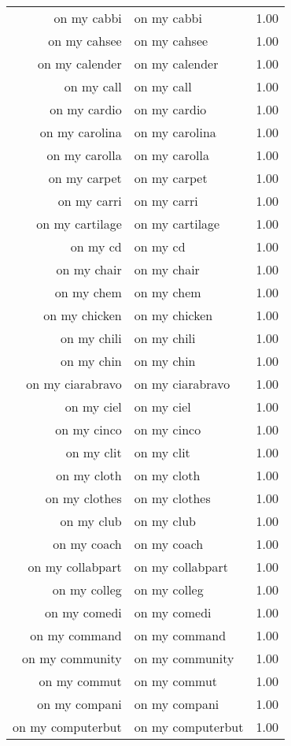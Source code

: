 \begin{table}[ht]
\begin{tabular}{rlr}
  on my cabbi & on my cabbi & 1.00 \\ 
  on my cahsee & on my cahsee & 1.00 \\ 
  on my calender & on my calender & 1.00 \\ 
  on my call & on my call & 1.00 \\ 
  on my cardio & on my cardio & 1.00 \\ 
  on my carolina & on my carolina & 1.00 \\ 
  on my carolla & on my carolla & 1.00 \\ 
  on my carpet & on my carpet & 1.00 \\ 
  on my carri & on my carri & 1.00 \\ 
  on my cartilage & on my cartilage & 1.00 \\ 
  on my cd & on my cd & 1.00 \\ 
  on my chair & on my chair & 1.00 \\ 
  on my chem & on my chem & 1.00 \\ 
  on my chicken & on my chicken & 1.00 \\ 
  on my chili & on my chili & 1.00 \\ 
  on my chin & on my chin & 1.00 \\ 
  on my ciarabravo & on my ciarabravo & 1.00 \\ 
  on my ciel & on my ciel & 1.00 \\ 
  on my cinco & on my cinco & 1.00 \\ 
  on my clit & on my clit & 1.00 \\ 
  on my cloth & on my cloth & 1.00 \\ 
  on my clothes & on my clothes & 1.00 \\ 
  on my club & on my club & 1.00 \\ 
  on my coach & on my coach & 1.00 \\ 
  on my collabpart & on my collabpart & 1.00 \\ 
  on my colleg & on my colleg & 1.00 \\ 
  on my comedi & on my comedi & 1.00 \\ 
  on my command & on my command & 1.00 \\ 
  on my community & on my community & 1.00 \\ 
  on my commut & on my commut & 1.00 \\ 
  on my compani & on my compani & 1.00 \\ 
  on my computerbut & on my computerbut & 1.00 \\ 

\end{tabular}
\end{table}
